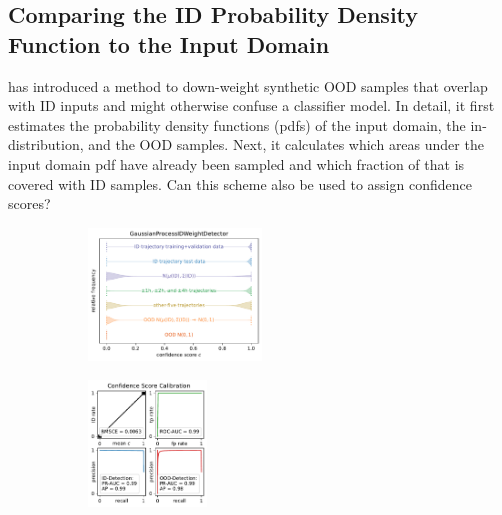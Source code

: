 \subsection{Comparing the ID Probability Density Function to the Input Domain}

 has introduced a method to down-weight synthetic OOD samples that overlap with ID inputs and might otherwise confuse a classifier model. In detail, it first estimates the probability density functions (pdfs) of the input domain, the in-distribution, and the OOD samples. Next, it calculates which areas under the input domain pdf have already been sampled and which fraction of that is covered with ID samples. Can this scheme also be used to assign confidence scores?

\begin{figure}[H]
    \centering
    \begin{subfigure}
        \centering
        \includegraphics[width=0.505\textwidth,valign=t]{ood-detection/figures/confidence-score/ood.gaussianprocessidweightdetector-distribution.pdf}
    \end{subfigure}
    \begin{subfigure}
        \centering
        \includegraphics[width=0.345\textwidth,valign=t]{ood-detection/figures/confidence-score/ood.gaussianprocessidweightdetector-calibration.pdf}
    \end{subfigure}


\end{figure}
